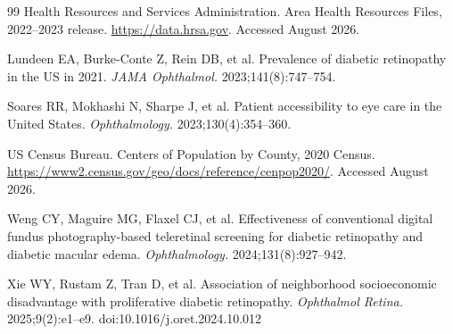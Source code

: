 \documentclass[11pt]{article}
\begin{document}
\begin{thebibliography}{99}
Health Resources and Services Administration. Area Health Resources Files,
2022--2023 release. \url{https://data.hrsa.gov}. Accessed August 2026.

Lundeen EA, Burke-Conte Z, Rein DB, et al. Prevalence of diabetic retinopathy in
the US in 2021. \emph{JAMA Ophthalmol.} 2023;141(8):747--754.

Soares RR, Mokhashi N, Sharpe J, et al. Patient accessibility to eye care in the
United States. \emph{Ophthalmology.} 2023;130(4):354--360.

US Census Bureau. Centers of Population by County, 2020 Census.
\url{https://www2.census.gov/geo/docs/reference/cenpop2020/}. Accessed August 2026.

Weng CY, Maguire MG, Flaxel CJ, et al. Effectiveness of conventional digital
fundus photography-based teleretinal screening for diabetic retinopathy and
diabetic macular edema. \emph{Ophthalmology.} 2024;131(8):927--942.

Xie WY, Rustam Z, Tran D, et al. Association of neighborhood socioeconomic
disadvantage with proliferative diabetic retinopathy. \emph{Ophthalmol Retina.}
2025;9(2):e1--e9. doi:10.1016/j.oret.2024.10.012

\end{thebibliography}
\end{document}
